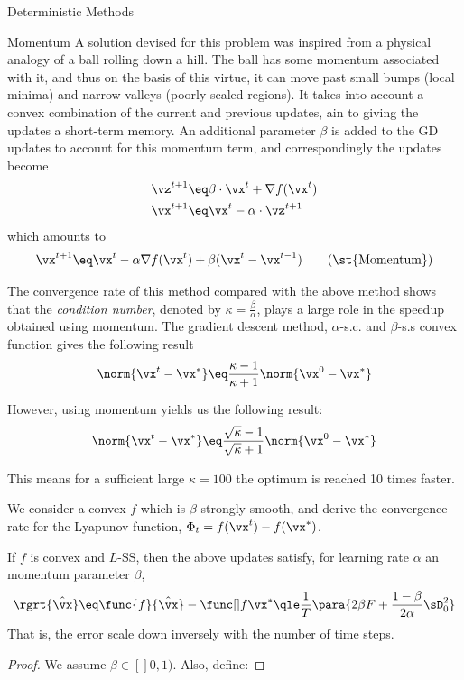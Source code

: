 \documentclass{article}
\begin{document}
\begin{psection}{Deterministic Methods}
\begin{psubsection}{Momentum}
		A solution devised for this problem was inspired from a physical analogy of a ball rolling down a hill. The ball has some momentum associated with it, and thus on the basis of this virtue, it can move past small bumps (local minima) and narrow valleys (poorly scaled regions). It takes into account a convex combination of the current and previous updates, ain to giving the updates a short-term memory. An additional parameter $\beta$ is added to the GD updates to account for this momentum term, and correspondingly the updates become
		\begin{align*}
			\vz^{t+1} &\eq \beta \cdot \vx^t+\nabla f(\vx^t) \\
			\vx^{t+1} &\eq \vx^t-\alpha \cdot \vz^{t+1}
		\end{align*}
		which amounts to
		\begin{equation}
			\vx^{t+1} \eq \vx^t-\alpha\nabla f(\vx^t) + \beta(\vx^t-\vx^{t-1})
			\tag{\st{Momentum}}
		\end{equation}

		The convergence rate of this method compared with the above method shows that the \textit{condition number}, denoted by $\kappa=\frac{\beta}{\alpha}$, plays a large role in the speedup obtained using momentum. The gradient descent method, $\alpha$-s.c. and $\beta$-s.s convex function gives the following result
		\begin{align*}
			\norm{\vx^t-\vx^*} \eq \frac{\kappa-1}{\kappa+1}\norm{\vx^0-\vx^*}
		\end{align*}

		However, using momentum yields us the following result:
		\begin{align*}
			\norm{\vx^t-\vx^*} \eq \frac{\sqrt{\kappa}-1}{\sqrt{\kappa}+1}\norm{\vx^0-\vx^*}
		\end{align*}

		This means for a sufficient large $\kappa=100$ the optimum is reached 10 times faster.

		We consider a convex $f$ which is $\beta$-strongly smooth, and derive the convergence rate for the Lyapunov function, $\Phi_t=f(\vx^t)-f(\vx^*)$.

		\begin{theorem}
			\label{th:momentum}
			If $f$ is convex and $L$-SS, then the above updates satisfy, for learning rate $\alpha$ an momentum parameter $\beta$,
			\begin{equation}
				\rgrt{\hat{\vx}} \eq \func{f}{\hat{\vx}} - \fs	\qle	\frac{1}{T} \para{2 \beta F +\frac{1-\beta}{2\alpha}\sD_0^2}
				\label{eq:momentum}
			\end{equation}
			That is, the error scale down inversely with the number of time steps.
			\begin{proof}
			We assume $\beta\in[]0,1)$. Also, define:


\end{proof}
\end{theorem}
\end{psubsection}
\end{psection}
\end{document}
